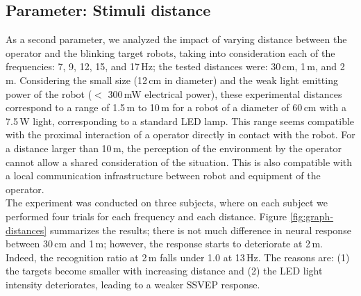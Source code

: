 \documentclass[smallextended]{svjour3}
\begin{document}
\subsection{Parameter: Stimuli distance}
As a second parameter, we analyzed the impact of varying distance between the operator and the blinking target robots, taking into consideration each of the frequencies: 7, 9, 12, 15, and 17\,Hz; the tested distances were: 30\,cm, 1\,m, and 2\,m. 
Considering the small size (12\,cm in diameter) and the weak light emitting power of the robot ($<$ 300\,mW electrical power), these experimental distances correspond to a range of 1.5\,m to 10\,m for a robot of a diameter of 60\,cm with a 7.5\,W light, corresponding to a standard LED lamp. 
This range seems compatible with the proximal interaction of a operator directly in contact with the robot. For a distance larger than 10\,m, the perception of the environment by the operator cannot allow a shared consideration of the situation. This is also compatible with a local communication infrastructure between robot and equipment of the operator.\\
The experiment was conducted on three subjects, where on each subject we performed four trials for each frequency and each distance. 
Figure \ref{fig:graph-distances} summarizes the results; there is not much difference in neural response between 30\,cm and 1\,m; however, the response starts to deteriorate at 2\,m. Indeed, the recognition ratio at 2\,m falls under 1.0 at 13\,Hz. 
The reasons are: (1) the targets become smaller with increasing distance and (2) the LED light intensity deteriorates, leading to a weaker SSVEP response.
\end{document}

